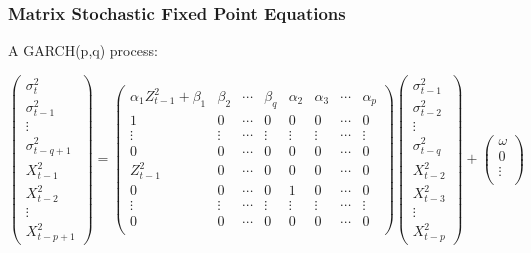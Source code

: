 \documentclass{beamer}
\begin{document}
\begin{frame}
  \frametitle{Matrix Stochastic Fixed Point Equations}
  A GARCH(p,q) process:
  \begin{tiny}
    \begin{equation*}
      \begin{pmatrix}
        \sigma_{t}^2 \\
        \sigma_{t-1}^2 \\
        \vdots \\
        \sigma_{t-q+1}^2 \\
        X_{t-1}^2 \\
        X_{t-2}^2 \\
        \vdots \\
        X_{t-p+1}^2
      \end{pmatrix} =
      \begin{pmatrix}
        \alpha_1 Z_{t-1}^2 + \beta_1 & \beta_2 & \cdots & \beta_q & \alpha_2 & \alpha_3 & \cdots & \alpha_p \\
        1 & 0 & \cdots & 0 & 0 & 0 & \cdots & 0 \\
        \vdots & \vdots & \cdots & \vdots & \vdots & \vdots & \cdots & \vdots \\
        0 & 0 & \cdots & 0 & 0 & 0 & \cdots & 0 \\
        Z_{t-1}^2 & 0 & \cdots & 0 & 0 & 0 & \cdots & 0 \\
        0 & 0 & \cdots & 0 & 1 & 0 & \cdots & 0 \\
        \vdots & \vdots & \cdots & \vdots & \vdots & \vdots & \cdots & \vdots \\
        0 & 0 & \cdots & 0 & 0 & 0 & \cdots & 0 \\    
      \end{pmatrix}
      \begin{pmatrix}
        \sigma_{t-1}^2 \\
        \sigma_{t-2}^2 \\
        \vdots \\
        \sigma_{t-q}^2 \\
        X_{t-2}^2 \\
        X_{t-3}^2 \\
        \vdots \\
        X_{t-p}^2
      \end{pmatrix} +
      \begin{pmatrix}
        \omega \\
        0 \\
        \vdots \\

\end{pmatrix}
\end{equation*}
\end{tiny}
\end{frame}
\end{document}
